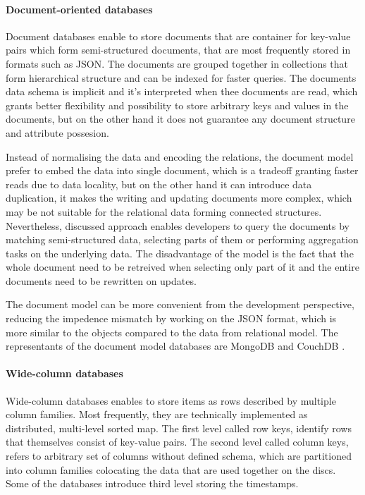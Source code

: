 \paragraph*{Document-oriented databases}

Document databases enable to store documents that are container for key-value pairs which form semi-structured documents, that are most frequently stored in formats such as JSON. The documents are grouped together in collections that form hierarchical structure and can be indexed for faster queries. The documents data schema is implicit and it's interpreted when thee documents are read, which grants better flexibility and possibility to store arbitrary keys and values in the documents, but on the other hand it does not guarantee any document structure and attribute possesion.

Instead of normalising the data and encoding the relations, the document model prefer to embed the data into single document, which is a tradeoff granting faster reads due to data locality, but on the other hand it can introduce data duplication, it makes the writing and updating documents more complex, which may be not suitable for the relational data forming connected structures. Nevertheless, discussed approach enables developers to query the documents by matching semi-structured data, selecting parts of them or performing aggregation tasks on the underlying data. 
The disadvantage of the model is the fact that the whole document need to be retreived when selecting only part of it and the entire documents need to be rewritten on updates.

The document model can be more convenient from the development perspective, reducing the impedence mismatch by working on the JSON format, which is more similar to the objects compared to the data from relational model. The representants of the document model databases are MongoDB and CouchDB \cite{DesignDataIntensiveApplications}.

\paragraph*{Wide-column databases}

Wide-column databases enables to store items as rows described by multiple column families. Most frequently, they are technically implemented as distributed, multi-level sorted map. The first level called row keys, identify rows that themselves consist of key-value pairs. The second level called column keys, refers to arbitrary set of columns without defined schema, which are partitioned into column families colocating the data that are used together on the discs. Some of the databases introduce third level storing the timestamps. 

